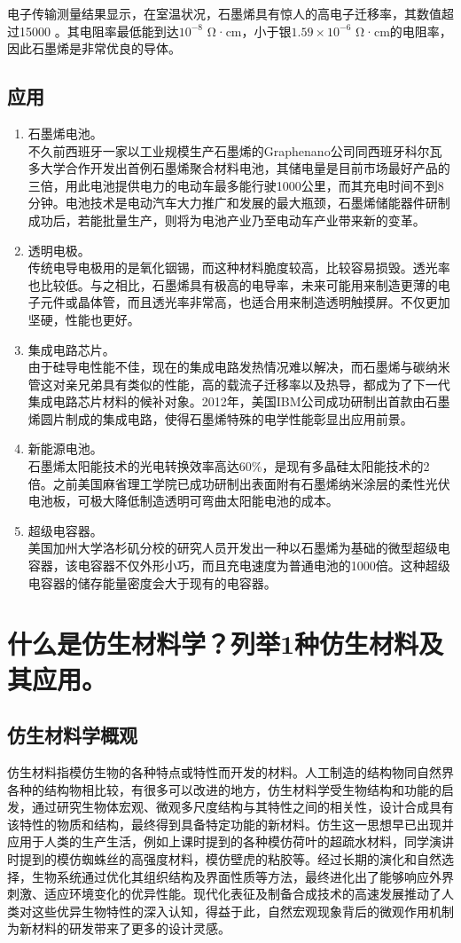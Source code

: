 \documentclass[UTF8,9pt]{ctexart}
\newcommand\e[1]{\times 10^{#1}}                                       %
\newcommand\se{\section}                                               %
\newcommand\sub{\subsection}                                           %
\newcommand{\rk}[1]{\begin{enumerate}                              %
        #1
    \end{enumerate}}
\begin{document}
电子传输测量结果显示，在室温状况，石墨烯具有惊人的高电子迁移率，其数值超过15000 。其电阻率最低能到达$10^{-8}$ Ω·cm，小于银$1.59 \e{-6}$ Ω·cm的电阻率，因此石墨烯是非常优良的导体。
\sub{应用}
\rk{
    \item 石墨烯电池。\\不久前西班牙一家以工业规模生产石墨烯的Graphenano公司同西班牙科尔瓦多大学合作开发出首例石墨烯聚合材料电池，其储电量是目前市场最好产品的三倍，用此电池提供电力的电动车最多能行驶1000公里，而其充电时间不到8分钟。电池技术是电动汽车大力推广和发展的最大瓶颈，石墨烯储能器件研制成功后，若能批量生产，则将为电池产业乃至电动车产业带来新的变革。
    \item 透明电极。\\传统电导电极用的是氧化铟锡，而这种材料脆度较高，比较容易损毁。透光率也比较低。与之相比，石墨烯具有极高的电导率，未来可能用来制造更薄的电子元件或晶体管，而且透光率非常高，也适合用来制造透明触摸屏。不仅更加坚硬，性能也更好。
    \item 集成电路芯片。\\由于硅导电性能不佳，现在的集成电路发热情况难以解决，而石墨烯与碳纳米管这对亲兄弟具有类似的性能，高的载流子迁移率以及热导，都成为了下一代集成电路芯片材料的候补对象。2012年，美国IBM公司成功研制出首款由石墨烯圆片制成的集成电路，使得石墨烯特殊的电学性能彰显出应用前景。
    \item 新能源电池。\\石墨烯太阳能技术的光电转换效率高达60\%，是现有多晶硅太阳能技术的2倍。之前美国麻省理工学院已成功研制出表面附有石墨烯纳米涂层的柔性光伏电池板，可极大降低制造透明可弯曲太阳能电池的成本。 
    \item 超级电容器。\\美国加州大学洛杉矶分校的研究人员开发出一种以石墨烯为基础的微型超级电容器，该电容器不仅外形小巧，而且充电速度为普通电池的1000倍。这种超级电容器的储存能量密度会大于现有的电容器。
}
\se{什么是仿生材料学？列举1种仿生材料及其应用。}
\sub{仿生材料学概观}
仿生材料指模仿生物的各种特点或特性而开发的材料。人工制造的结构物同自然界各种的结构物相比较，有很多可以改进的地方，仿生材料学受生物结构和功能的启发，通过研究生物体宏观、微观多尺度结构与其特性之间的相关性，设计合成具有该特性的物质和结构，最终得到具备特定功能的新材料。仿生这一思想早已出现并应用于人类的生产生活，例如上课时提到的各种模仿荷叶的超疏水材料，同学演讲时提到的模仿蜘蛛丝的高强度材料，模仿壁虎的粘胶等。经过长期的演化和自然选择，生物系统通过优化其组织结构及界面性质等方法，最终进化出了能够响应外界刺激、适应环境变化的优异性能。现代化表征及制备合成技术的高速发展推动了人类对这些优异生物特性的深入认知，得益于此，自然宏观现象背后的微观作用机制为新材料的研发带来了更多的设计灵感。
\end{document}

